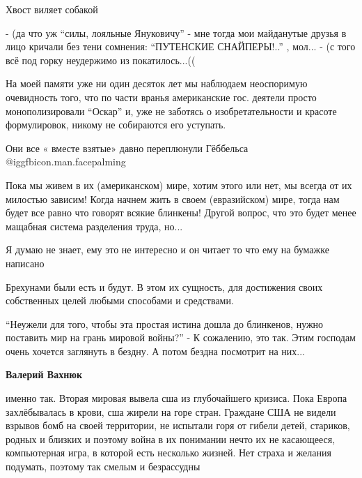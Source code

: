 \begin{itemize}
Хвост виляет собакой


- (да что уж \enquote{силы, лояльные Януковичу} - мне тогда мои майданутые друзья в
лицо кричали без тени сомнения: \enquote{ПУТЕНСКИЕ СНАЙПЕРЫ!..} , мол... - (с того всё
под горку неудержимо из покатилось...((



На моей памяти уже ни один десяток лет мы наблюдаем неоспоримую очевидность
того, что по части вранья американские гос. деятели просто монополизировали
\enquote{Оскар} и, уже не заботясь о изобретательности и красоте формулировок, никому
не собираются его уступать.


Они все « вместе взятые» давно переплюнули Гёббельса  @igg{fbicon.man.facepalming} 

Пока мы живем в их (американском) мире, хотим этого или нет, мы всегда от их милостью зависим!
Когда начнем жить в своем (евразийском) мире, тогда нам будет все равно что говорят всякие блинкены!
Другой вопрос, что это будет менее мащабная система разделения труда, но...

Я думаю не знает, ему это не интересно и он читает то что ему на бумажке написано

Брехунами были есть и будут. В этом их сущность, для достижения своих
собственных целей любыми способами и средствами.


\enquote{Неужели для того, чтобы эта простая истина дошла до блинкенов, нужно поставить
мир на грань мировой войны?} - К сожалению, это так. Этим господам очень
хочется заглянуть в бездну. А потом бездна посмотрит на них...

\begin{itemize} %
\textbf{Валерий Вахнюк} 

именно так. Вторая мировая вывела сша из глубочайшего кризиса. Пока Европа
захлёбывалась в крови, сша жирели на горе стран. Граждане США не видели взрывов
бомб на своей территории, не испытали горя от гибели детей, стариков, родных и
близких и поэтому война в их понимании нечто их не касающееся, компьютерная
игра, в которой есть несколько жизней. Нет страха и желания подумать, поэтому
так смелым и безрассудны

\end{itemize} %


\end{itemize}
